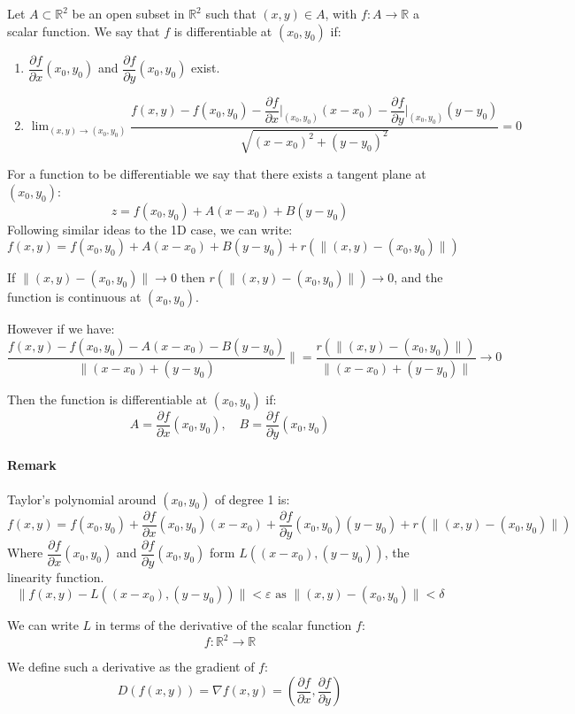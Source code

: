 \documentclass[11pt]{article}
\begin{document}
Let $A \subset \mathbb{R}^2$ be an open subset in $\mathbb{R}^2$ such that $(x,y) \in A$, with $f : A \rightarrow \mathbb{R}$ a scalar function. We say that $f$ is differentiable at $(x_0, y_0)$ if: 
\begin{enumerate}
    \item $\dfrac{\partial f}{\partial x}(x_0, y_0)$ and $\dfrac{\partial f}{\partial y}(x_0, y_0)$ exist.
    \item $\lim_{(x,y) \to (x_0, y_0)} \dfrac{f(x,y) - f(x_0, y_0) - \dfrac{\partial f}{\partial x}\big|_{(x_0, y_0)}(x - x_0) - \dfrac{\partial f}{\partial y}\big|_{(x_0, y_0)}(y - y_0)}{\sqrt{(x - x_0)^2 + (y - y_0)^2}} = 0$
\end{enumerate}

For a function to be differentiable we say that there exists a tangent plane at $(x_0, y_0)$:
\[
z = f(x_0, y_0) + A(x - x_0) + B(y - y_0)
\]
Following similar ideas to the 1D case, we can write:
\[
f(x,y) = f(x_0, y_0) + A(x - x_0) + B(y - y_0) + r(\|(x, y) - (x_0,y_0)\|)
\]

If $\|(x, y) - (x_0,y_0)\| \to 0$ then $r(\|(x, y) - (x_0,y_0)\|) \to 0$, and the function is continuous at $(x_0, y_0)$.

However if we have:
\[
\frac{f(x,y) - f(x_0, y_0) - A(x - x_0) - B(y - y_0)}{\|(x - x_0) + (y - y_0)}\| = \frac{r(\|(x, y) - (x_0,y_0)\|)}{\|(x - x_0) + (y - y_0)\|} \to 0
\]

Then the function is differentiable at $(x_0, y_0)$ if:
\[
A = \frac{\partial f}{\partial x}(x_0, y_0), \quad B = \frac{\partial f}{\partial y}(x_0, y_0)
\]

\paragraph{Remark}
Taylor's polynomial around $(x_0, y_0)$ of degree 1 is:
\[
f(x,y) = f(x_0, y_0) + \frac{\partial f}{\partial x}(x_0, y_0)(x - x_0) + \frac{\partial f}{\partial y}(x_0, y_0)(y - y_0) + r(\|(x, y) - (x_0,y_0)\|)
\]
Where $\dfrac{\partial f}{\partial x}(x_0, y_0)$ and $\dfrac{\partial f}{\partial y}(x_0, y_0)$ form $L\left((x - x_0), (y - y_0)\right)$, the linearity function.
\[
\|f(x,y) - L\left((x - x_0), (y - y_0)\right)\| < \varepsilon \text{ as } \|(x, y) - (x_0, y_0)\| < \delta
\]

We can write $L$ in terms of the derivative of the scalar function $f$:
\[
f : \mathbb{R}^2 \rightarrow \mathbb{R} 
\]

We define such a derivative as the gradient of $f$:
\[
D(f(x,y)) = \nabla f(x,y) = \left(\frac{\partial f}{\partial x}, \frac{\partial f}{\partial y}\right)
\]
\end{document}
